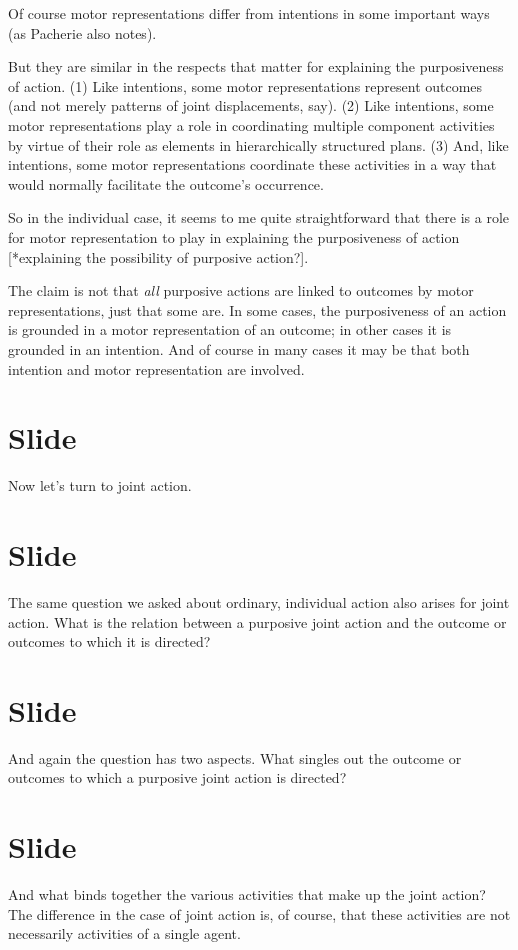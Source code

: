 \documentclass[12pt,\papersize]{extarticle}
\begin{document}
Of course motor representations differ from intentions in some important ways (as Pacherie also notes).

But they are similar in the respects that matter for explaining the purposiveness of action.
(1) Like intentions, some motor representations represent outcomes (and not merely patterns of joint displacements, say).
(2) Like intentions, some motor representations play a role in coordinating multiple  component activities by virtue of their role as elements in hierarchically structured plans.
(3) And, like intentions, some motor representations coordinate these activities in a way that would normally facilitate the outcome’s occurrence.

So in the individual case, it seems to me quite straightforward that there is a role for motor representation to play in explaining the purposiveness of action [*explaining the possibility of purposive action?].

The claim is not that \emph{all} purposive actions are linked to outcomes by motor representations, just that some are.
In some cases, the purposiveness of an action is grounded in a motor representation of an outcome; in other cases it is grounded in an intention.
And of course in many cases it may be that both intention and motor representation are involved.



\section{Slide}
Now let’s turn to joint action.



\section{Slide}
The same question we asked about ordinary, individual action also arises for joint action.
What is the relation between a purposive joint action and the outcome or outcomes to which it is directed?




\section{Slide}
And again the question has two aspects.
What singles out the outcome or outcomes to which a purposive joint action is directed?



\section{Slide}
And what binds together the various activities that make up the joint action?
The difference in the case of joint action is, of course, that these activities are not necessarily activities of a single agent.
\end{document}
